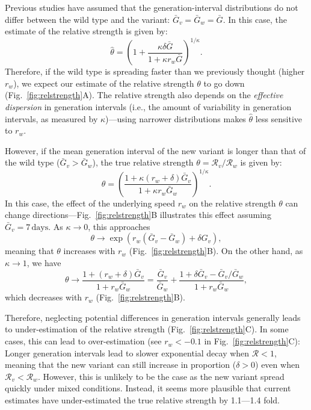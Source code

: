 \documentclass[12pt]{article}
\newcommand{\fref}[1]{Fig.~\ref{fig:#1}}
\newcommand{\RR}{\ensuremath{{\mathcal R}}\xspace}
\begin{document}
Previous studies have assumed that the generation-interval distributions do not differ between the wild type and the variant: $\bar{G}_v = \bar{G}_w = \bar{G}$.
In this case, the estimate of the relative strength is given by:
\begin{equation}
\hat{\theta} = \left(1 + \frac{\kappa \delta \bar{G}}{1 + \kappa r_w \bar{G}}\right)^{1/\kappa}.
\end{equation}
Therefore, if the wild type is spreading faster than we previously thought (higher $r_w$), we expect our estimate of the relative strength $\theta$ to go down (\fref{relstrength}A).
The relative strength also depends on the \emph{effective dispersion} in generation intervals (i.e., the amount of variability in generation intervals, as measured by $\kappa$)---using narrower distributions makes $\hat{\theta}$ less sensitive to $r_w$.

However, if the mean generation interval of the new variant is longer than that of the wild type ($\bar{G}_v > \bar{G}_w$), the true relative strength $\theta = \RR_v/\RR_w$ is given by:
\begin{equation}
\theta = \left(\frac{1 + \kappa (r_w + \delta) \bar{G}_v}{1 + \kappa r_w \bar{G}_w}\right)^{1/\kappa}.
\end{equation}
In this case, the effect of the underlying speed $r_w$ on the relative strength $\theta$ can change directions---\fref{relstrength}B illustrates this effect assuming $\bar{G}_v=7\,\textrm{days}$.
As $\kappa \to 0$, this approaches
\begin{equation}
\theta \to \exp(r_w (\bar{G}_v-\bar{G}_w)+\delta G_v), 
\end{equation}
meaning that $\theta$ increases with $r_w$ (\fref{relstrength}B).
On the other hand, as $\kappa \to 1$, we have
\begin{equation}
\theta \to \frac{1 + (r_w + \delta) \bar{G}_v}{1 + r_w \bar{G}_w} = \frac{\bar{G}_v}{\bar{G}_w} + \frac{1+ \delta \bar{G}_v  - \bar{G}_v/\bar{G}_w}{1 + r_w \bar{G}_w},
\end{equation}
which decreases with $r_w$ (\fref{relstrength}B).

Therefore, neglecting potential differences in generation intervals generally leads to under-estimation of the relative strength (\fref{relstrength}C).
In some cases, this can lead to over-estimation (see $r_w < -0.1$ in \fref{relstrength}C):
Longer generation intervals lead to slower exponential decay when $\RR < 1$, meaning that the new variant can still increase in proportion ($\delta > 0$) even when $\RR_v < \RR_w$.
However, this is unlikely to be the case as the new variant spread quickly under mixed conditions.
Instead, it seems more plausible that current estimates have under-estimated the true relative strength by 1.1---1.4 fold.
\end{document}
